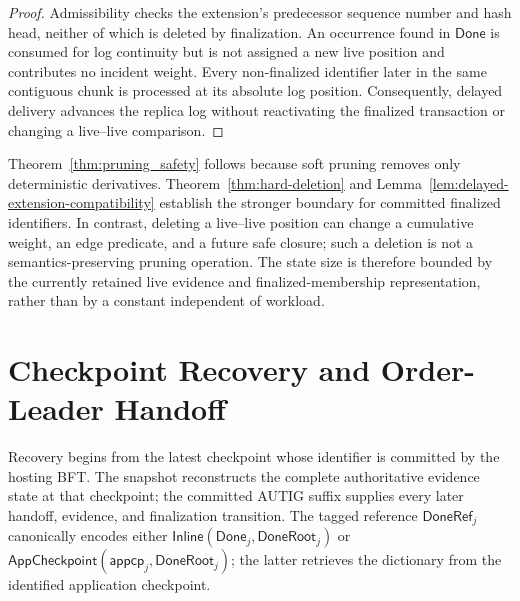 \begin{proof}
Admissibility checks the extension's predecessor sequence number and hash head,
neither of which is deleted by finalization.  An occurrence found in
$\mathsf{Done}$ is consumed for log continuity but is not assigned a new live
position and contributes no incident weight.  Every non-finalized identifier
later in the same contiguous chunk is processed at its absolute log position.
Consequently, delayed delivery advances the replica log without reactivating
the finalized transaction or changing a live--live comparison.
\end{proof}

Theorem~\ref{thm:pruning_safety} follows because soft pruning removes only
deterministic derivatives.  Theorem~\ref{thm:hard-deletion} and
Lemma~\ref{lem:delayed-extension-compatibility} establish the stronger boundary
for committed finalized identifiers.  In contrast, deleting a live--live
position can change a cumulative weight, an edge predicate, and a future safe
closure; such a deletion is not a semantics-preserving pruning operation.
The state size is therefore bounded by the currently retained live evidence
and finalized-membership representation, rather than by a constant independent
of workload.

\section{Checkpoint Recovery and Order-Leader Handoff}
\label{app:checkpoint-handoff}

Recovery begins from the latest checkpoint whose identifier is committed by
the hosting BFT.  The snapshot reconstructs the complete authoritative
evidence state at that checkpoint; the committed AUTIG suffix supplies every
later handoff, evidence, and finalization transition.  The tagged reference
$\mathsf{DoneRef}_j$ canonically encodes either
$\mathsf{Inline}(\mathsf{Done}_j,\mathsf{DoneRoot}_j)$ or
$\mathsf{AppCheckpoint}(\mathsf{appcp}_j,\mathsf{DoneRoot}_j)$; the latter
retrieves the dictionary from the identified application checkpoint.


